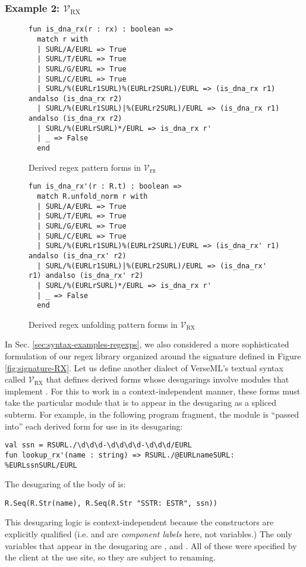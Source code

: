 {\subsubsection{Example 2: $\mathcal{V}_\text{RX}$}
\begin{figure}
\begin{lstlisting}[numbers=none]
fun is_dna_rx(r : rx) : boolean => 
  match r with 
  | SURL/A/EURL => True
  | SURL/T/EURL => True
  | SURL/G/EURL => True
  | SURL/C/EURL => True
  | SURL/%(EURLr1SURL)%(EURLr2SURL)/EURL => (is_dna_rx r1) andalso (is_dna_rx r2)
  | SURL/%(EURLr1SURL)|%(EURLr2SURL)/EURL => (is_dna_rx r1) andalso (is_dna_rx r2)
  | SURL/%(EURLrSURL)*/EURL => is_dna_rx r'
  | _ => False
  end
\end{lstlisting}
\vspace{-5px}
\caption{Derived regex pattern forms in $\mathcal{V}_\texttt{rx}$}
\label{fig:derived-pattern-syntax}
\end{figure}
\begin{figure}
\begin{lstlisting}[numbers=none]
fun is_dna_rx'(r : R.t) : boolean => 
  match R.unfold_norm r with 
  | SURL/A/EURL => True
  | SURL/T/EURL => True
  | SURL/G/EURL => True
  | SURL/C/EURL => True
  | SURL/%(EURLr1SURL)%(EURLr2SURL)/EURL => (is_dna_rx' r1) andalso (is_dna_rx' r2)
  | SURL/%(EURLr1SURL)|%(EURLr2SURL)/EURL => (is_dna_rx' r1) andalso (is_dna_rx' r2)
  | SURL/%(EURLrSURL)*/EURL => is_dna_rx r'
  | _ => False
  end
\end{lstlisting}\vspace{-5px}
\caption{Derived regex unfolding pattern forms in $\mathcal{V}_\text{RX}$}
\label{fig:VRX-pats}
\end{figure}

In Sec. \ref{sec:syntax-examples-regexps}, we also considered a more sophisticated formulation of our regex library organized around the signature  defined in Figure \ref{fig:signature-RX}. Let us define another dialect of VerseML's textual syntax called $\mathcal{V}_\text{RX}$ that defines derived forms whose desugarings involve modules that implement . For this to work in a  context-independent manner, these forms must take the particular module that is to appear in the desugaring as a spliced subterm. For example, in the following program fragment, the module  is ``passed into'' each derived form for use in its desugaring:
\begin{lstlisting}[numbers=none]
val ssn = RSURL./\d\d\d-\d\d\d\d-\d\d\d/EURL
fun lookup_rx'(name : string) => RSURL./@EURLnameSURL: %EURLssnSURL/EURL
\end{lstlisting}
The desugaring of the body of  is:
\begin{lstlisting}[numbers=none]
R.Seq(R.Str(name), R.Seq(R.Str "SSTR: ESTR", ssn))
\end{lstlisting}
This desugaring logic is context-independent because the constructors are explicitly qualified (i.e.  and  are \emph{component labels} here, not variables.) The only variables that appear in the desugaring are ,  and . All of these were specified by the client at the use site, so they are subject to renaming.

}
